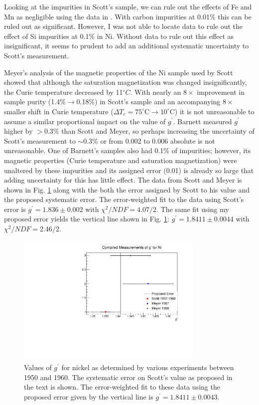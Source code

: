 \documentclass[12pt]{article}
\begin{document}
Looking at the impurities in Scott's sample, we can rule out the effects of Fe and Mn as negligible using the data in \cite{Standley1955, Scott1969}. With carbon impurities at 0.01\% this can be ruled out as significant. However, I was not able to locate data to rule out the effect of Si impurities at 0.1\% in Ni. Without data to rule out this effect as insignificant, it seems to prudent to add an additional systematic uncertainty to Scott's measurement.

Meyer's analysis of the magnetic properties of the Ni sample used by Scott showed that although the saturation magnetization was changed insignificantly, the Curie temperature decreased by 11$^{\circ}C$. With nearly an $8\times$ improvement in sample purity (1.4\%$\rightarrow$0.18\%) in Scott's sample and an accompanying $8\times$ smaller shift in Curie temperature ($\Delta T_c=75^{\circ}$C$\rightarrow10^{\circ}$C) it is not unreasonable to assume a similar proportional impact on the value of $g^{\prime}$. Barnett measured $g^{\prime}$ higher by $>0.3$\% than Scott and Meyer, so perhaps increasing the uncertainty of Scott's measurement to $\sim$0.3\% or from 0.002 to 0.006 absolute is not unreasonable. One of Barnett's samples also had 0.1\% of impurities; however, its magnetic properties (Curie temperature and saturation magnetization) were unaltered by these impurities and its assigned error (0.01) is already so large that adding uncertainty for this has little effect. The data from Scott and Meyer is shown in Fig. \ref{fig:gprime_world_data_Ni} along with the both the error assigned by Scott to his value and the proposed systematic error. The error-weighted fit to the data using Scott's error is $g^{\prime}=1.836\pm0.002$ with $\chi^2/NDF=4.07/2$. The same fit using my proposed error yields the vertical line shown in Fig. \ref{fig:gprime_world_data_Ni}: $g^{\prime}=1.8411\pm0.0044$ with $\chi ^2/NDF=2.46/2$.

\begin{figure}[h]
\centering
\includegraphics[width=0.8\textwidth]{gprime_world_data_Ni.pdf}
\caption{Values of $g^{\prime}$ for nickel as determined by various experiments between 1950 and 1960. The systematic error on Scott's value as proposed in the text is shown. The error-weighted fit to these data using the proposed error given by the vertical line is $g^{\prime}=1.8411\pm0.0043$.}
\label{fig:gprime_world_data_Ni}
\end{figure}
\end{document}
